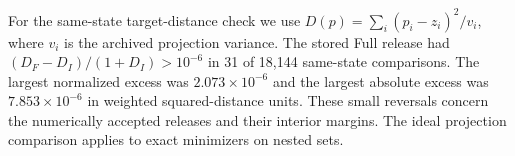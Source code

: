 For the same-state target-distance check we use $D(p)=\sum_i(p_i-z_i)^2/v_i$, where $v_i$ is the archived projection variance. The stored Full release had $(D_F-D_I)/(1+D_I)>10^{-6}$ in 31 of 18,144 same-state comparisons. The largest normalized excess was $2.073\times10^{-6}$ and the largest absolute excess was $7.853\times10^{-6}$ in weighted squared-distance units. These small reversals concern the numerically accepted releases and their interior margins. The ideal projection comparison applies to exact minimizers on nested sets.


